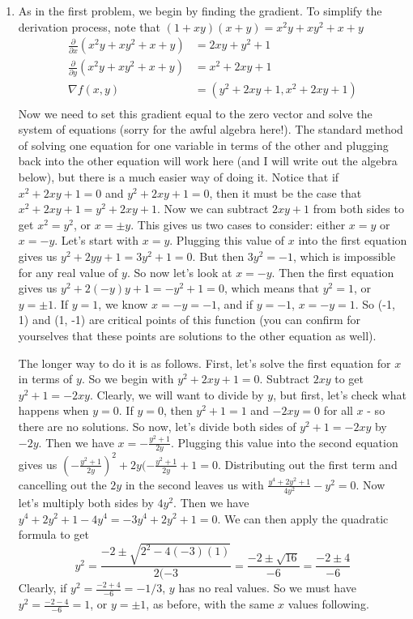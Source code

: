 \documentclass[10pt]{amsart}
\begin{document}
\begin{enumerate}
\item As in the first problem, we begin by finding the gradient. To simplify the derivation process, note that $(1+xy)(x+y) = x^2y + xy^2 + x + y$
\begin{align*}
\frac{\partial}{\partial x}(x^2y + xy^2 + x + y) &= 2xy + y^2 + 1 \\
\frac{\partial}{\partial y}(x^2y + xy^2 + x + y) &= x^2 + 2xy + 1\\
\nabla f(x,y) &=(y^2 + 2xy + 1, x^2+2xy + 1)\\
\end{align*}
Now we need to set this gradient equal to the zero vector and solve the system of equations (sorry for the awful algebra here!). The standard method of solving one equation for one variable in terms of the other and plugging back into the other equation will work here (and I will write out the algebra below), but there is a much easier way of doing it. Notice that if $x^2 + 2xy + 1 = 0$ and $y^2 + 2xy + 1 = 0$, then it must be the case that $x^2 + 2xy + 1 = y^2 + 2xy + 1$. Now we can subtract $2xy + 1$ from both sides to get $x^2 = y^2$, or $x = \pm y$. This gives us two cases to consider: either $x = y$ or $x = -y$. Let's start with $x = y$. Plugging this value of $x$ into the first equation gives us $y^2 + 2yy+1 = 3y^2 + 1 = 0$. But then $3y^2 = -1$, which is impossible for any real value of $y$. So now let's look at $x = -y$. Then the first equation gives us $y^2 + 2(-y)y + 1 = -y^2 + 1 = 0$, which means that $y^2 = 1$, or $y = \pm 1$. If $y = 1$, we know $x = -y = -1$, and if $y = -1$, $x = -y = 1$. So (-1, 1) and (1, -1) are critical points of this function (you can confirm for yourselves that these points are solutions to the other equation as well). 

The longer way to do it is as follows. First, let's solve the first equation for $x$ in terms of $y$. So we begin with $y^2 + 2xy + 1 = 0$. Subtract $2xy$ to get $y^2 + 1 = -2xy$. Clearly, we will want to divide by $y$, but first, let's check what happens when $y=0$. If $y=0$, then $y^2 + 1 = 1$ and $-2xy = 0$ for all $x$ - so there are no solutions. So now, let's divide both sides of $y^2 + 1 = -2xy$ by $-2y$. Then we have $x = -\frac{y^2+1}{2y}$. Plugging this value into the second equation gives us $(-\frac{y^2+1}{2y})^2 + 2y(-\frac{y^2+1}{2y} + 1 = 0$. Distributing out the first term and cancelling out the $2y$ in the second leaves us with $\frac{y^4 + 2y^2 + 1}{4y^2} - y^2 = 0$. Now let's multiply both sides by $4y^2$. Then we have $y^4 + 2y^2 + 1 - 4y^4 = -3y^4 + 2y^2 + 1 = 0$. We can then apply the quadratic formula to get $$y^2 = \frac{-2 \pm \sqrt{2^2 - 4(-3)(1)}}{2(-3} = \frac{-2 \pm \sqrt{16}}{-6} = \frac{-2 \pm 4}{-6}$$ Clearly, if $y^2 = \frac{-2 + 4}{-6} = -1/3$, $y$ has no real values. So we must have $y^2 = \frac{-2-4}{-6} = 1$, or $y = \pm 1$, as before, with the same $x$ values following.


\end{enumerate}
\end{document}
